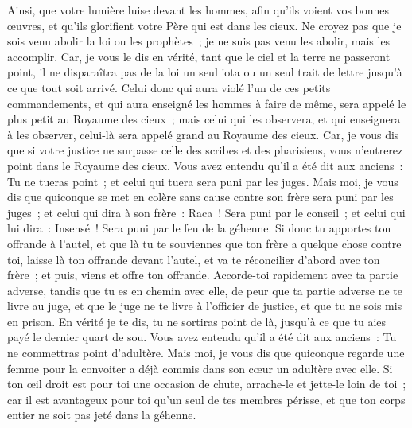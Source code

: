 \begin{multicols}{2}
Ainsi, que votre lumière luise devant les hommes, afin qu'ils voient vos bonnes œuvres, et qu'ils glorifient votre Père qui est dans les cieux.
Ne croyez pas que je sois venu abolir la loi ou les prophètes~; je ne suis pas venu les abolir, mais les accomplir.
Car, je vous le dis en vérité, tant que le ciel et la terre ne passeront point, il ne disparaîtra pas de la loi un seul iota ou un seul trait de lettre jusqu'à ce que tout soit arrivé.
Celui donc qui aura violé l'un de ces petits commandements, et qui aura enseigné les hommes à faire de même, sera appelé le plus petit au Royaume des cieux~; mais celui qui les observera, et qui enseignera à les observer, celui-là sera appelé grand au Royaume des cieux.
Car, je vous dis que si votre justice ne surpasse celle des scribes et des pharisiens, vous n'entrerez point dans le Royaume des cieux.
Vous avez entendu qu'il a été dit aux anciens~: Tu ne tueras point~; et celui qui tuera sera puni par les juges.
Mais moi, je vous dis que quiconque se met en colère sans cause contre son frère sera puni par les juges~; et celui qui dira à son frère~: Raca~! Sera puni par le conseil~; et celui qui lui dira~: Insensé~! Sera puni par le feu de la géhenne.
Si donc tu apportes ton offrande à l'autel, et que là tu te souviennes que ton frère a quelque chose contre toi,
laisse là ton offrande devant l'autel, et va te réconcilier d'abord avec ton frère~; et puis, viens et offre ton offrande.
Accorde-toi rapidement avec ta partie adverse, tandis que tu es en chemin avec elle, de peur que ta partie adverse ne te livre au juge, et que le juge ne te livre à l'officier de justice, et que tu ne sois mis en prison.
En vérité je te dis, tu ne sortiras point de là, jusqu'à ce que tu aies payé le dernier quart de sou.
Vous avez entendu qu'il a été dit aux anciens~: Tu ne commettras point d'adultère.
Mais moi, je vous dis que quiconque regarde une femme pour la convoiter a déjà commis dans son cœur un adultère avec elle.
Si ton œil droit est pour toi une occasion de chute, arrache-le et jette-le loin de toi~; car il est avantageux pour toi qu'un seul de tes membres périsse, et que ton corps entier ne soit pas jeté dans la géhenne.

\end{multicols}
